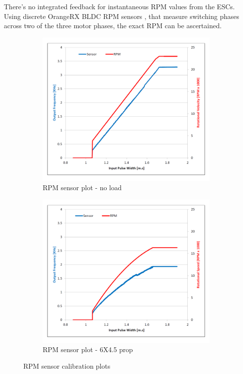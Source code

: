 There's no integrated feedback for instantaneous RPM values from the ESCs. Using discrete OrangeRX BLDC RPM sensors \cite{orangerpm}, that measure switching phases across two of the three motor phases, the exact RPM can be ascertained.
\par
\begin{figure}[htbp]
\begin{subfigure}{0.5\textwidth}
\centering
\includegraphics[width=\textwidth]{graphs/rpm-sensor-noload}
\caption{RPM sensor plot - no load}
\label{fig:rpm-sensor-noload}
\end{subfigure}
\begin{subfigure}{0.5\textwidth}
\centering
\includegraphics[width=\textwidth]{graphs/rpm-sensor-prop}
\caption{RPM sensor plot - 6X4.5 prop}
\label{fig:rpm-sensor-prop}
\end{subfigure}
\caption{RPM sensor calibration plots}
\label{fig:rpm-sensor}
\end{figure}
